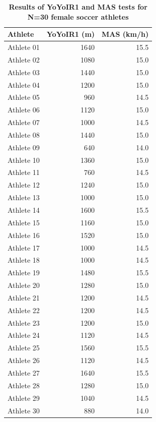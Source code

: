 \documentclass[
]{book}
\begin{document}
\begin{table}

\caption{\label{tab:yoyo-mas-results}\textbf{Results of YoYoIR1 and MAS tests for N=30 female soccer athletes}}
\centering
\begin{tabular}[t]{lrr}
\toprule
Athlete & YoYoIR1 (m) & MAS (km/h)\\
\midrule
Athlete 01 & 1640 & 15.5\\
Athlete 02 & 1080 & 15.0\\
Athlete 03 & 1440 & 15.0\\
Athlete 04 & 1200 & 15.0\\
Athlete 05 & 960 & 14.5\\
\addlinespace
Athlete 06 & 1120 & 15.0\\
Athlete 07 & 1000 & 14.5\\
Athlete 08 & 1440 & 15.0\\
Athlete 09 & 640 & 14.0\\
Athlete 10 & 1360 & 15.0\\
\addlinespace
Athlete 11 & 760 & 14.5\\
Athlete 12 & 1240 & 15.0\\
Athlete 13 & 1000 & 15.0\\
Athlete 14 & 1600 & 15.5\\
Athlete 15 & 1160 & 15.0\\
\addlinespace
Athlete 16 & 1520 & 15.0\\
Athlete 17 & 1000 & 14.5\\
Athlete 18 & 1000 & 14.5\\
Athlete 19 & 1480 & 15.5\\
Athlete 20 & 1280 & 15.0\\
\addlinespace
Athlete 21 & 1200 & 14.5\\
Athlete 22 & 1200 & 14.5\\
Athlete 23 & 1200 & 15.0\\
Athlete 24 & 1120 & 14.5\\
Athlete 25 & 1560 & 15.5\\
\addlinespace
Athlete 26 & 1120 & 14.5\\
Athlete 27 & 1640 & 15.5\\
Athlete 28 & 1280 & 15.0\\
Athlete 29 & 1040 & 14.5\\
Athlete 30 & 880 & 14.0\\
\bottomrule
\end{tabular}
\end{table}
\end{document}
